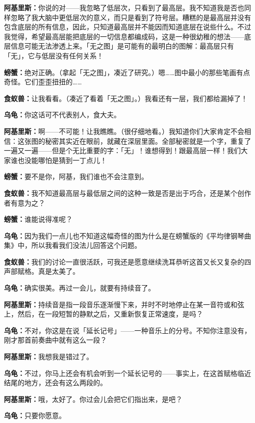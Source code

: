 \documentclass[
  12pt,
  twoside,
  openright,
  oldfontcommands,
]{memoir}
\newcommand{\kaitismall}[1]{{\kaitifamily\small #1}}
\newcommand{\dialogname}[1]{{\heifamily\bfseries #1}}
\begin{document}
\dialogname{阿基里斯：}你说的对------我忽略了低层次，只看到了最高层。我不知道我是否也同样忽略了我大脑中更低层次的意义，而只是看到了符号层。糟糕的是最高层并没有包含底层的所有信息，因此，只知道最高层并不能因而知道底层在说些什么。不过我觉得，希望最高层能把底层的一切信息都编成码，这是一种很幼稚的想法------底层信息可能无法渗透上来。「无之图」是可能有的最明白的图解：最高层只有「无」，它与低层没有任何关系！

\dialogname{螃蟹：}绝对正确。\kaitismall{（拿起「无之图」，凑近了研究。）}嗯\ldots\ldots 图中最小的那些笔画有点奇怪。它们歪歪扭扭的\ldots\ldots{}

\dialogname{食蚁兽：}让我看看。\kaitismall{（凑近了看着「无之图」。）}我看还有一层，我们都给漏掉了！

\dialogname{乌龟：}你这话可不代表别人，食大夫。

\dialogname{阿基里斯：}啊------不可能！让我瞧瞧。\kaitismall{（很仔细地看。）}我知道你们大家肯定不会相信：这张图的秘密其实近在眼前，就藏在深层里面。全部秘密就是一个字，重复了一遍又一遍------但是个无比重要的字：「无」！谁想得到！跟最高层一样！我们大家谁也没能哪怕是猜到一丁点儿！

\dialogname{螃蟹：}要不是你，阿基，我们谁也不会注意到。

\dialogname{食蚁兽：}我不知道最高层与最低层之间的这种一致是否是出于巧合，还是某个创作者有意为之？

\dialogname{螃蟹：}谁能说得准呢？

\dialogname{乌龟：}因为我们一点儿也不知道这幅奇怪的图为什么是在螃蟹版的《平均律钢琴曲集》中，所以我看我们没法儿回答这个问题。

\dialogname{食蚁兽：}我们的讨论一直很活跃，可我还是愿意继续洗耳恭听这首又长又复杂的四声部赋格。真是太美了。

\dialogname{乌龟：}确实很美。再过一会儿，就要有持续音了。

\dialogname{阿基里斯：}持续音是指一段音乐逐渐慢下来，并时不时地停止在某一音符或和弦上，然后，在一段短暂的静默之后，又重新恢复正常速度，是吗？

\dialogname{乌龟：}不对，你这是在说「延长记号」------一种音乐上的分号。不知你注意没有，刚才那首前奏曲中就有这么一段？

\dialogname{阿基里斯：}我想我是错过了。

\dialogname{乌龟：}不过，你马上还会有机会听到一个延长记号的------事实上，在这首赋格临近结尾的地方，还会有这么两段的。

\dialogname{阿基里斯：}哦，太好了。你过会儿会把它们指出来，是吧？

\dialogname{乌龟：}只要你愿意。
\end{document}
